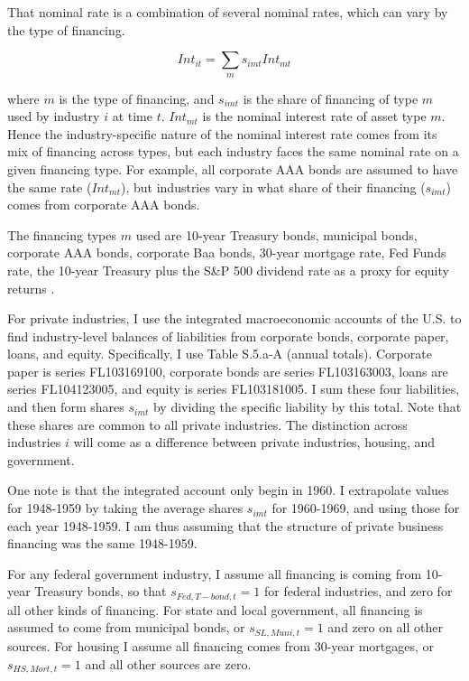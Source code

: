 \documentclass[11pt]{article}
\begin{document}
That nominal rate is a combination of several nominal rates, which can vary by the type of financing. 

\begin{equation}
    Int_{it} = \sum_m s_{imt} Int_{mt}
\end{equation} 

where $m$ is the type of financing, and $s_{imt}$ is the share of financing of type $m$ used by industry $i$ at time $t$. $Int_{mt}$ is the nominal interest rate of asset type $m$. Hence the industry-specific nature of the nominal interest rate comes from its mix of financing across types, but each industry faces the same nominal rate on a given financing type. For example, all corporate AAA bonds are assumed to have the same rate ($Int_{mt}$), but industries vary in what share of their financing ($s_{imt}$) comes from corporate AAA bonds. 

The financing types $m$ used are 10-year Treasury bonds, municipal bonds, corporate AAA bonds, corporate Baa bonds, 30-year mortgage rate, Fed Funds rate, the 10-year Treasury plus the S\&P 500 dividend rate as a proxy for equity returns \citep{fedint,fredmort,moodys}.

For private industries, I use the integrated macroeconomic accounts of the U.S. \citep{beaimap} to find industry-level balances of liabilities from corporate bonds, corporate paper, loans, and equity. Specifically, I use Table S.5.a-A (annual totals). Corporate paper is series FL103169100, corporate bonds are series FL103163003, loans are series FL104123005, and equity is series FL103181005. I sum these four liabilities, and then form shares $s_{imt}$ by dividing the specific liability by this total. Note that these shares are common to all private industries. The distinction across industries $i$ will come as a difference between private industries, housing, and government. 

One note is that the integrated account only begin in 1960. I extrapolate values for 1948-1959 by taking the average shares $s_{imt}$ for 1960-1969, and using those for each year 1948-1959. I am thus assuming that the structure of private business financing was the same 1948-1959. 

For any federal government industry, I assume all financing is coming from 10-year Treasury bonds, so that $s_{Fed,T-bond,t} = 1$ for federal industries, and zero for all other kinds of financing. For state and local government, all financing is assumed to come from municipal bonds, or $s_{SL,Muni,t} = 1$ and zero on all other sources. For housing I assume all financing comes from 30-year mortgages, or $s_{HS,Mort,t}=1$ and all other sources are zero. 
\end{document}
